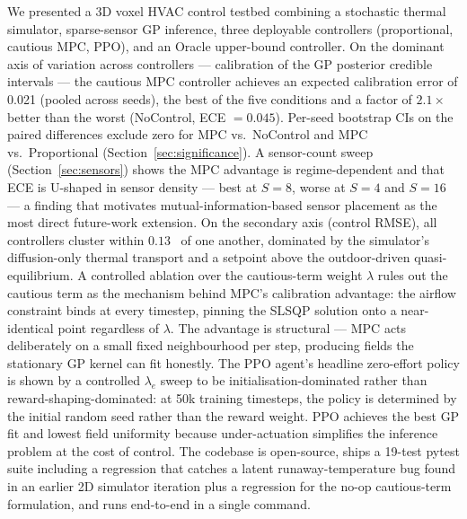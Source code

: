 \documentclass[11pt,letterpaper]{article}
\begin{document}
We presented a 3D voxel HVAC control testbed combining a stochastic
thermal simulator, sparse-sensor GP inference, three deployable
controllers (proportional, cautious MPC, PPO), and an Oracle upper-bound
controller. On the dominant axis of variation across controllers ---
calibration of the GP posterior credible intervals --- the cautious MPC
controller achieves an expected calibration error of 0.021 (pooled
across seeds), the best of the five conditions and a factor of
$2.1\times$ better than the worst (NoControl, ECE $= 0.045$).
Per-seed bootstrap CIs on the paired differences exclude zero for
MPC vs.\ NoControl and MPC vs.\ Proportional
(Section~\ref{sec:significance}). A sensor-count sweep
(Section~\ref{sec:sensors}) shows the MPC advantage is regime-dependent
and that ECE is U-shaped in sensor density --- best at $S = 8$, worse
at $S = 4$ and $S = 16$ --- a finding that motivates
mutual-information-based sensor placement as the most direct future-work
extension.
On the secondary axis (control RMSE), all controllers cluster within
$0.13$~\textcelsius{} of one another, dominated by the simulator's
diffusion-only thermal transport and a setpoint above the outdoor-driven
quasi-equilibrium. A controlled ablation over the cautious-term weight
$\lambda$ rules out the cautious term as the mechanism behind MPC's
calibration advantage: the airflow constraint binds at every timestep,
pinning the SLSQP solution onto a near-identical point regardless of
$\lambda$. The advantage is structural --- MPC acts deliberately on a
small fixed neighbourhood per step, producing fields the stationary GP
kernel can fit honestly. The PPO agent's headline zero-effort
policy is shown by a controlled $\lambda_e$ sweep to be
initialisation-dominated rather than reward-shaping-dominated: at
50k training timesteps, the policy is determined by the initial random
seed rather than the reward weight. PPO achieves the best GP fit and
lowest field uniformity because under-actuation simplifies the
inference problem at the cost of control. The codebase is
open-source, ships a 19-test pytest suite including a regression that
catches a latent runaway-temperature bug found in an earlier 2D
simulator iteration plus a regression for the no-op cautious-term
formulation, and runs end-to-end in a single command.


\end{document}
